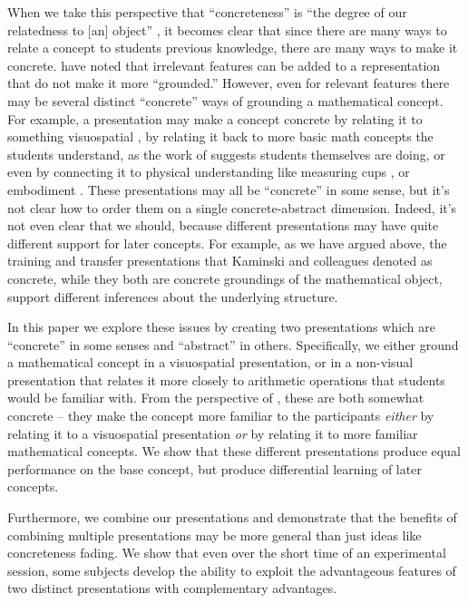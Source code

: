 \documentclass[man,10pt]{apa6}
\begin{document}
When we take this perspective that ``concreteness'' is ``the degree of our relatedness to [an] object'' \cite{Wilensky1991}, it becomes clear that since there are many ways to relate a concept to students previous knowledge, there are many ways to make it concrete.  have noted that irrelevant features can be added to a representation that do not make it more ``grounded.'' However, even for relevant features there may be several distinct ``concrete'' ways of grounding a mathematical concept. For example, a presentation may make a concept concrete by relating it to something visuospatial \cite{Rau2016}, by relating it back to more basic math concepts the students understand, as the work of  suggests students themselves are doing, or even by connecting it to physical understanding like measuring cups \cite{Kaminski2008}, or embodiment \cite{Nathan2008}. These presentations may all be ``concrete'' in some sense, but it's not clear how to order them on a single concrete-abstract dimension. Indeed, it's not even clear that we should, because different presentations may have quite different support for later concepts. For example, as we have argued above, the training and transfer presentations that Kaminski and colleagues denoted as concrete, while they both are concrete groundings of the mathematical object, support different inferences about the underlying structure. \par
In this paper we explore these issues by creating two presentations which are ``concrete'' in some senses and ``abstract'' in others. Specifically, we either ground a mathematical concept in a visuospatial presentation, or in a non-visual presentation that relates it more closely to arithmetic operations that students would be familiar with. From the perspective of , these are both somewhat concrete -- they make the concept more familiar to the participants \emph{either} by relating it to a visuospatial presentation \emph{or} by relating it to more familiar mathematical concepts. We show that these different presentations produce equal performance on the base concept, but produce differential learning of later concepts.\par
Furthermore, we combine our presentations and demonstrate that the benefits of combining multiple presentations may be more general than just ideas like concreteness fading. We show that even over the short time of an experimental session, some subjects develop the ability to exploit the advantageous features of two distinct presentations with complementary advantages. \par
\end{document}
